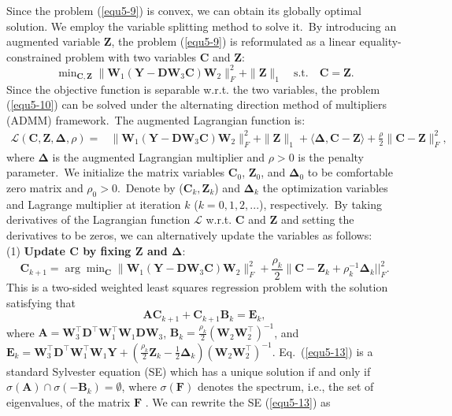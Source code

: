 Since the problem (\ref{equ5-9}) is convex, we can obtain its globally optimal solution. We employ the variable splitting method \cite{Eckstein1992} to solve it.\ By introducing an augmented variable $\bm{Z}$, the problem (\ref{equ5-9}) is reformulated as a linear equality-constrained problem with two variables $\bm{C}$ and $\bm{Z}$:
\begin{equation}
\label{equ5-10}
\min\nolimits_{\bm{C},\bm{Z}}\|\bm{W}_{1}(\bm{Y}-\bm{D}\bm{W}_{3}\bm{C})\bm{W}_{2}\|_{F}^{2}
+
\|\bm{Z}\|_{1}
\quad
\text{s.t.}
\quad
\bm{C}=\bm{Z}.
\end{equation}
Since the objective function is separable w.r.t. the two variables, the problem (\ref{equ5-10}) can be solved under the alternating direction method of multipliers (ADMM) \cite{admm} framework.\ The augmented Lagrangian function is:
\begin{equation}
\label{equ5-11}
\begin{split}
\mathcal{L}(\bm{C},\bm{Z},\bm{\Delta},\rho)
=
&\|\bm{W}_{1}(\bm{Y}-\bm{D}\bm{W}_{3}\bm{C})\bm{W}_{2}\|_{F}^{2}
+
\|\bm{Z}\|_{1}
+
\langle
\bm{\Delta},\bm{C}-\bm{Z}
\rangle
+
\frac{\rho}{2}
\|\bm{C}-\bm{Z}\|_{F}^{2},
\end{split}
\end{equation}
where $\bm{\Delta}$ is the augmented Lagrangian multiplier and $\rho>0$ is the penalty parameter.\ We initialize the matrix variables $\bm{C}_{0}$, $\bm{Z}_{0}$, and $\bm{\Delta}_{0}$ to be comfortable zero matrix and $\rho_{0}>0$.\ Denote by ($\bm{C}_{k}, \bm{Z}_{k}$) and $\bm{\Delta}_{k}$ the optimization variables and Lagrange multiplier at iteration $k$ ($k=0,1,2,...$), respectively.\ By taking derivatives of the Lagrangian function $\mathcal{L}$ w.r.t. $\bm{C}$ and $\bm{Z}$ and setting the derivatives to be zeros, we can alternatively update the variables as follows:
\\
(1) \textbf{Update $\bm{C}$ by fixing $\bm{Z}$ and $\bm{\Delta}$}:
\begin{equation}
\label{equ5-12}
\bm{C}_{k+1}
=
\arg\min\nolimits_{\bm{C}}
\|\bm{W}_{1}(\bm{Y}-\bm{D}\bm{W}_{3}\bm{C})\bm{W}_{2}\|_{F}^{2} 
+
\frac{\rho_{k}}{2}\|\bm{C} - \bm{Z}_{k} + \rho_{k}^{-1}\bm{\Delta}_{k}||_{F}^{2}.
\end{equation}
This is a two-sided weighted least squares regression problem with the solution satisfying that
\begin{equation}
\label{equ5-13}
\bm{A}\bm{C}_{k+1}
+
\bm{C}_{k+1}\bm{B}_{k}
=
\bm{E}_{k},
\end{equation}
where $\bm{A}=\bm{W}_{3}^{\top}\bm{D}^{\top}\bm{W}_{1}^{\top}\bm{W}_{1}\bm{D}\bm{W}_{3}$, $\bm{B}_{k}=\frac{\rho_{k}}{2}(\bm{W}_{2}\bm{W}_{2}^{\top})^{-1}$, and $\bm{E}_{k}=\bm{W}_{3}^{\top}\bm{D}^{\top}\bm{W}_{1}^{\top}\bm{W}_{1}\bm{Y}+(\frac{\rho_{k}}{2}\bm{Z}_{k} -\frac{1}{2}\bm{\Delta}_{k})(\bm{W}_{2}\bm{W}_{2}^{\top})^{-1}$. Eq.\ (\ref{equ5-13}) is a standard Sylvester equation (SE) which has a unique solution if and only if $\sigma(\bm{A})\cap\sigma(-\bm{B}_{k})=\emptyset$, where $\sigma(\bm{F})$ denotes the spectrum, i.e., the set of eigenvalues, of the matrix $\bm{F}$ \cite{simoncini2016computational}. We can rewrite the SE (\ref{equ5-13}) as 
